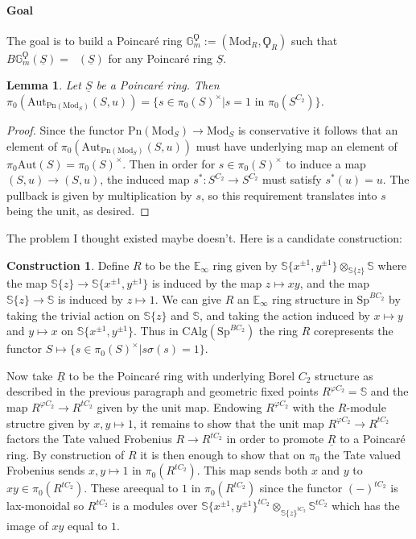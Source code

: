 \documentclass{article}
\DeclareMathOperator{\Picp}{Pic^p} %
\renewcommand{\phi}{\varphi}
\newtheorem{lemma}[theorem]{Lemma}
\theoremstyle{definition}
\newtheorem{construction}[theorem]{Construction}
\begin{document}
\paragraph{Goal} The goal is to build a Poincar{\'e} ring $\mathbb{G}_{m}^\Qoppa:=(\mathrm{Mod}_R, \Qoppa_R)$  such that $B\mathbb{G}_m^\Qoppa(\underline{S}) = \Picp(\underline{S})$ for any Poincar{\'e} ring $\underline{S}$.
\begin{lemma}
Let $\underline{S}$ be a Poincar{\'e} ring. Then $\pi_0(\mathrm{Aut}_{\mathrm{Pn}(\mathrm{Mod}_S)}(S,u))=\{s\in \pi_0(S)^\times | s=1 \textrm{ in }\pi_0(S^{C_2})\}$.
\end{lemma}
\begin{proof}
Since the functor $\mathrm{Pn}(\mathrm{Mod}_S)\to \mathrm{Mod}_S$ is conservative it follows that an element of $\pi_0(\mathrm{Aut}_{\mathrm{Pn}(\mathrm{Mod}_S)}(S,u))$ must have underlying map an element of $\pi_0\mathrm{Aut}(S)=\pi_0(S)^\times$. Then in order for $s\in \pi_0(S)^\times$ to induce a map $(S,u)\to (S,u)$, the induced map $s^*:S^{C_2}\to S^{C_2}$ must satisfy $s^*(u)=u$. The pullback is given by multiplication by $s$, so this requirement translates into $s$ being the unit, as desired.
\end{proof}

The problem I thought existed maybe doesn't. Here is a candidate construction:

\begin{construction}
Define $R$ to be the $\mathbb{E}_\infty$ ring given by $\mathbb{S}\{x^{\pm 1}, y^{\pm 1}\}\otimes_{\mathbb{S}\{z\}}\mathbb{S}$ where the map $\mathbb{S}\{z\}\to \mathbb{S}\{x^{\pm 1}, y^{\pm 1}\}$ is induced by the map $z\mapsto xy$, and the map $\mathbb{S}\{z\}\to \mathbb{S}$ is induced by $z\mapsto 1$. We can give $R$ an $\mathbb{E}_\infty$ ring structure in $\mathrm{Sp}^{BC_2}$ by taking the trivial action on $\mathbb{S}\{z\}$ and $\mathbb{S}$, and taking the action induced by $x\mapsto y$ and $y\mapsto x$ on $\mathbb{S}\{x^{\pm 1}, y^{\pm 1}\}$. Thus in $\mathrm{CAlg}(\mathrm{Sp}^{BC_2})$ the ring $R$ corepresents the functor $S\mapsto \{s\in \pi_0(S)^\times| s\sigma(s)=1\}$.

Now take $\underline{R}$ to be the Poincar{\'e} ring with underlying Borel $C_2$ structure as described in the previous paragraph and geometric fixed points $R^{\phi C_2}=\mathbb{S}$ and the map $R^{\phi C_2}\to R^{tC_2}$ given by the unit map. Endowing $R^{\phi C_2}$ with the $R$-module structre given by $x,y\mapsto 1$, it remains to show that the unit map $R^{\phi C_2}\to R^{tC_2}$ factors the Tate valued Frobenius $R\to R^{tC_2}$ in order to promote $\underline{R}$ to a Poincar{\'e} ring. By construction of $R$ it is then enough to show that on $\pi_0$ the Tate valued Frobenius sends $x,y\mapsto 1$ in $\pi_0(R^{tC_2})$. This map sends both $x$ and $y$ to $xy\in \pi_0(R^{tC_2})$. These areequal to $1$ in $\pi_0(R^{tC_2})$ since the functor $(-)^{tC_2}$ is lax-monoidal so $R^{tC_2}$ is a modules over $\mathbb{S}\{x^{\pm 1}, y^{\pm 1}\}^{tC_2}\otimes_{\mathbb{S}\{z\}^{tC_2}}\mathbb{S}^{tC_2}$ which has the image of $xy$ equal to $1$. 
\end{construction}
\end{document}
